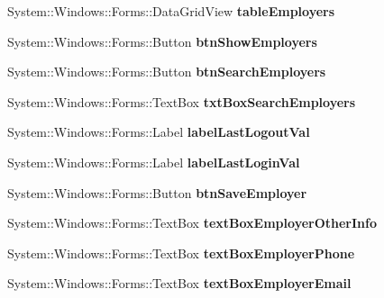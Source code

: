 \begin{DoxyCompactItemize}
System\+::\+Windows\+::\+Forms\+::\+Data\+Grid\+View {\bfseries table\+Employers}
\item 
\hypertarget{class_magazyn_1_1_magazin_a92657d4bc89157aa30b81fd849a67fd7}{}\label{class_magazyn_1_1_magazin_a92657d4bc89157aa30b81fd849a67fd7} 
System\+::\+Windows\+::\+Forms\+::\+Button {\bfseries btn\+Show\+Employers}
\item 
\hypertarget{class_magazyn_1_1_magazin_a1cdadda667b3d0362594de5b60a821ef}{}\label{class_magazyn_1_1_magazin_a1cdadda667b3d0362594de5b60a821ef} 
System\+::\+Windows\+::\+Forms\+::\+Button {\bfseries btn\+Search\+Employers}
\item 
\hypertarget{class_magazyn_1_1_magazin_a20766961f9fab19e42cbdc1617fe8118}{}\label{class_magazyn_1_1_magazin_a20766961f9fab19e42cbdc1617fe8118} 
System\+::\+Windows\+::\+Forms\+::\+Text\+Box {\bfseries txt\+Box\+Search\+Employers}
\item 
\hypertarget{class_magazyn_1_1_magazin_ace4fec39b8163d99b93a94fd556eb2fe}{}\label{class_magazyn_1_1_magazin_ace4fec39b8163d99b93a94fd556eb2fe} 
System\+::\+Windows\+::\+Forms\+::\+Label {\bfseries label\+Last\+Logout\+Val}
\item 
\hypertarget{class_magazyn_1_1_magazin_a30ffae8a12e46244153a8ec375a8e040}{}\label{class_magazyn_1_1_magazin_a30ffae8a12e46244153a8ec375a8e040} 
System\+::\+Windows\+::\+Forms\+::\+Label {\bfseries label\+Last\+Login\+Val}
\item 
\hypertarget{class_magazyn_1_1_magazin_a98fa2859dbf46a55959e78aad6a6497f}{}\label{class_magazyn_1_1_magazin_a98fa2859dbf46a55959e78aad6a6497f} 
System\+::\+Windows\+::\+Forms\+::\+Button {\bfseries btn\+Save\+Employer}
\item 
\hypertarget{class_magazyn_1_1_magazin_a59b18febd54d42d666a921ef87e01bef}{}\label{class_magazyn_1_1_magazin_a59b18febd54d42d666a921ef87e01bef} 
System\+::\+Windows\+::\+Forms\+::\+Text\+Box {\bfseries text\+Box\+Employer\+Other\+Info}
\item 
\hypertarget{class_magazyn_1_1_magazin_a3f5183c2d4bdc483f03b87527616f2e8}{}\label{class_magazyn_1_1_magazin_a3f5183c2d4bdc483f03b87527616f2e8} 
System\+::\+Windows\+::\+Forms\+::\+Text\+Box {\bfseries text\+Box\+Employer\+Phone}
\item 
\hypertarget{class_magazyn_1_1_magazin_adc45a008ad68bde27ab9d77c6d6c2c48}{}\label{class_magazyn_1_1_magazin_adc45a008ad68bde27ab9d77c6d6c2c48} 
System\+::\+Windows\+::\+Forms\+::\+Text\+Box {\bfseries text\+Box\+Employer\+Email}
\item 
\hypertarget{class_magazyn_1_1_magazin_af221e2f7c26e94356b84419032070c09}{}\label{class_magazyn_1_1_magazin_af221e2f7c26e94356b84419032070c09} 

\end{DoxyCompactItemize}
